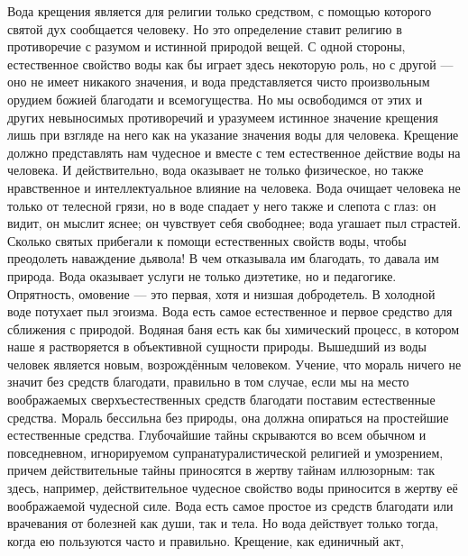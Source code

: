 \documentclass[12pt,oneside]{book}
\begin{document}
Вода крещения является для религии только средством, с помощью которого святой дух сообщается человеку. Но это определение ставит религию в противоречие с разумом и истинной природой вещей. С одной стороны, естественное свойство воды как бы играет здесь некоторую роль, но с другой --- оно не имеет никакого значения, и вода представляется чисто произвольным орудием божией благодати и всемогущества. Но мы освободимся от этих и других невыносимых противоречий и уразумеем истинное значение крещения лишь при взгляде на него как на указание значения воды для человека. Крещение должно представлять нам чудесное и вместе с тем естественное действие воды на человека. И действительно, вода оказывает не только физическое, но также нравственное и интеллектуальное влияние на человека. Вода очищает человека не только от телесной грязи, но в воде спадает у него также и слепота с глаз: он видит, он мыслит яснее; он чувствует себя свободнее; вода угашает пыл страстей. Сколько святых прибегали к помощи естественных свойств воды, чтобы преодолеть наваждение дьявола! В чем отказывала им благодать, то давала им природа. Вода оказывает услуги не только диэтетике, но и педагогике. Опрятность, омовение --- это первая, хотя и низшая добродетель\ddag\let\svthefootnote\thefootnote\let\thefootnote\relax{}\let\thefootnote\svthefootnote. В холодной воде потухает пыл эгоизма. Вода есть самое естественное и первое средство для сближения с природой. Водяная баня есть как бы химический процесс, в котором наше я растворяется в объективной сущности природы. Вышедший из воды человек является новым, возрождённым человеком. Учение, что мораль ничего не значит без средств благодати, правильно в том случае, если мы на место воображаемых сверхъестественных средств благодати поставим естественные средства. Мораль бессильна без природы, она должна опираться на простейшие естественные средства. Глубочайшие тайны скрываются во всем обычном и повседневном, игнорируемом супранатуралистической религией и умозрением, причем действительные тайны приносятся в жертву тайнам иллюзорным: так здесь, например, действительное чудесное свойство воды приносится в жертву её воображаемой чудесной силе. Вода есть самое простое из средств благодати или врачевания от болезней как души, так и тела. Но вода действует только тогда, когда ею пользуются часто и правильно. Крещение, как единичный акт, 
\end{document}
